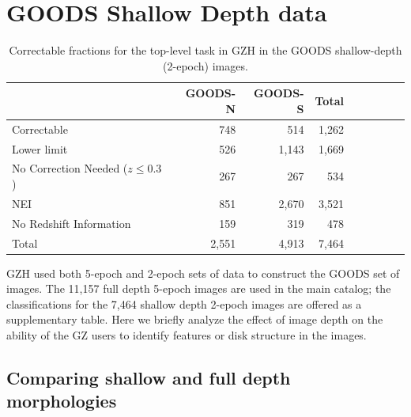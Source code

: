 \documentclass[twocolumn]{aastex6}
\begin{document}
\newpage
\clearpage

\appendix

\section{GOODS Shallow Depth data}


\begin{table}
\caption{Correctable fractions for the top-level task in GZH in the GOODS shallow-depth (2-epoch) images. \label{tbl:goods_shallow_categories}}
\begin{tabular}{lrrrrrrrr}
\hline\hline
                                   & GOODS-N & GOODS-S & Total \\
\hline
Correctable                        & 748     & 514     & 1,262 \\
Lower limit                        & 526     & 1,143   & 1,669 \\
No Correction Needed ($z \le 0.3$) & 267     & 267     & 534   \\ 
NEI                                & 851     & 2,670   & 3,521 \\
No Redshift Information            & 159     & 319     & 478   \\
Total                              & 2,551   & 4,913   & 7,464 \\
\hline\hline
\end{tabular}
\end{table}



GZH used both 5-epoch and 2-epoch sets of data to construct the GOODS set of images. The 11,157 full depth 5-epoch images are used in the main catalog; the classifications for the 7,464 shallow depth 2-epoch images are offered as a supplementary table. Here we briefly analyze the effect of image depth on the ability of the GZ users to identify features or disk structure in the images. 

\subsection{Comparing shallow and full depth morphologies}
\end{document}
